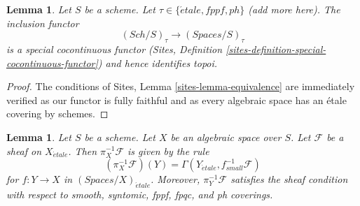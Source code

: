 \documentclass{stacks-project}
\theoremstyle{plain}
\newtheorem{lemma}[subsection]{Lemma}
\theoremstyle{definition}
\theoremstyle{remark}
\numberwithin{equation}{subsection}
\def\Sch{\mathit{Sch}}
\def\etale{{\acute{e}tale}}
\begin{document}
\begin{lemma}
\label{lemma-compare-cohomology-other-topologies}
Let $S$ be a scheme. Let $\tau \in \{\etale, fppf, ph\}$ (add more here).
The inclusion functor
$$
(\Sch/S)_\tau \longrightarrow (\textit{Spaces}/S)_\tau
$$
is a special cocontinuous functor
(Sites, Definition \ref{sites-definition-special-cocontinuous-functor})
and hence identifies topoi.
\end{lemma}

\begin{proof}
The conditions of Sites, Lemma \ref{sites-lemma-equivalence}
are immediately verified as our functor is fully faithful
and as every algebraic space has an \'etale covering by schemes.
\end{proof}

\begin{lemma}
\label{lemma-describe-pullback}
Let $S$ be a scheme. Let $X$ be an algebraic space over $S$.
Let $\mathcal{F}$ be a sheaf on $X_\etale$. Then
$\pi_X^{-1}\mathcal{F}$ is given by the rule
$$
(\pi_X^{-1}\mathcal{F})(Y) = \Gamma(Y_\etale, f_{small}^{-1}\mathcal{F})
$$
for $f : Y \to X$ in $(\textit{Spaces}/X)_\etale$.
Moreover, $\pi_Y^{-1}\mathcal{F}$ satisfies the
sheaf condition with respect to smooth, syntomic, fppf, fpqc, and ph coverings.
\end{lemma}
\end{document}
